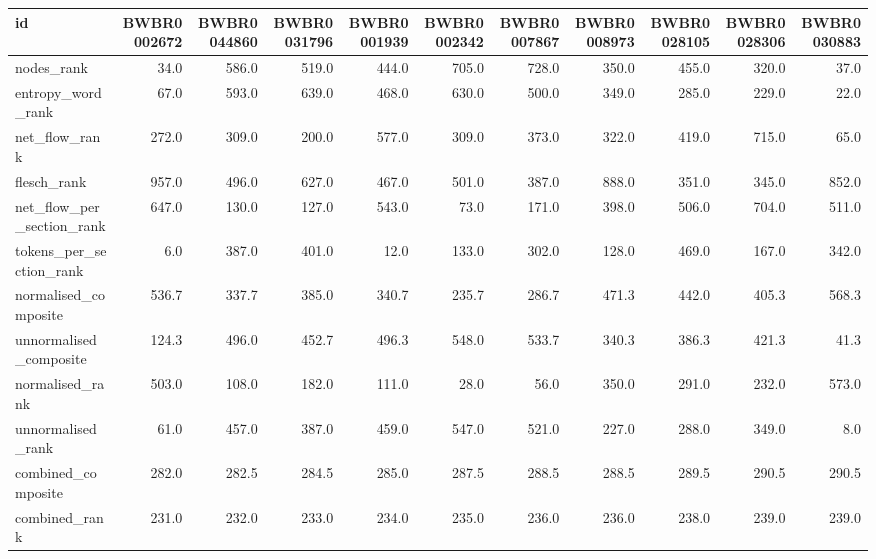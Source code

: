 \begin{tabular}{lrrrrrrrrrr}
\toprule
id & BWBR0002672 & BWBR0044860 & BWBR0031796 & BWBR0001939 & BWBR0002342 & BWBR0007867 & BWBR0008973 & BWBR0028105 & BWBR0028306 & BWBR0030883 \\
\midrule
nodes\_rank & 34.0 & 586.0 & 519.0 & 444.0 & 705.0 & 728.0 & 350.0 & 455.0 & 320.0 & 37.0 \\
\cline{1-11}
entropy\_word\_rank & 67.0 & 593.0 & 639.0 & 468.0 & 630.0 & 500.0 & 349.0 & 285.0 & 229.0 & 22.0 \\
\cline{1-11}
net\_flow\_rank & 272.0 & 309.0 & 200.0 & 577.0 & 309.0 & 373.0 & 322.0 & 419.0 & 715.0 & 65.0 \\
\cline{1-11}
flesch\_rank & 957.0 & 496.0 & 627.0 & 467.0 & 501.0 & 387.0 & 888.0 & 351.0 & 345.0 & 852.0 \\
\cline{1-11}
net\_flow\_per\_section\_rank & 647.0 & 130.0 & 127.0 & 543.0 & 73.0 & 171.0 & 398.0 & 506.0 & 704.0 & 511.0 \\
\cline{1-11}
tokens\_per\_section\_rank & 6.0 & 387.0 & 401.0 & 12.0 & 133.0 & 302.0 & 128.0 & 469.0 & 167.0 & 342.0 \\
\cline{1-11}
normalised\_composite & 536.7 & 337.7 & 385.0 & 340.7 & 235.7 & 286.7 & 471.3 & 442.0 & 405.3 & 568.3 \\
\cline{1-11}
unnormalised\_composite & 124.3 & 496.0 & 452.7 & 496.3 & 548.0 & 533.7 & 340.3 & 386.3 & 421.3 & 41.3 \\
\cline{1-11}
normalised\_rank & 503.0 & 108.0 & 182.0 & 111.0 & 28.0 & 56.0 & 350.0 & 291.0 & 232.0 & 573.0 \\
\cline{1-11}
unnormalised\_rank & 61.0 & 457.0 & 387.0 & 459.0 & 547.0 & 521.0 & 227.0 & 288.0 & 349.0 & 8.0 \\
\cline{1-11}
combined\_composite & 282.0 & 282.5 & 284.5 & 285.0 & 287.5 & 288.5 & 288.5 & 289.5 & 290.5 & 290.5 \\
\cline{1-11}
combined\_rank & 231.0 & 232.0 & 233.0 & 234.0 & 235.0 & 236.0 & 236.0 & 238.0 & 239.0 & 239.0 \\
\cline{1-11}
\bottomrule
\end{tabular}
